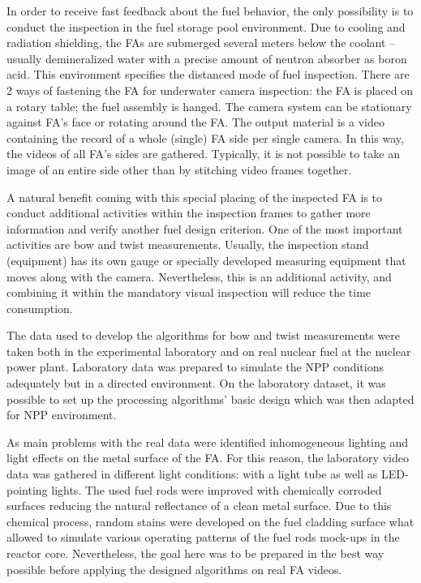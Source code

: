 \documentclass[preprint,12pt]{elsarticle}
\begin{document}
In order to receive fast feedback about the fuel behavior, the only possibility is to conduct the inspection in the fuel storage pool environment. Due to cooling and radiation  shielding, the \ac{FA}s are submerged several meters below the coolant – usually demineralized water with a precise amount of neutron absorber as boron acid. This environment specifies the distanced mode of fuel inspection. There are 2 ways of fastening the \ac{FA} for underwater camera inspection: the \ac{FA} is placed on a rotary table; the fuel assembly is hanged. The camera system can be stationary against \ac{FA}'s face or rotating around the \ac{FA}.  The output material is a video containing the record of a whole (single) \ac{FA} side per single camera. 
In this way, the videos of all \ac{FA}’s sides are gathered. Typically, it is not possible to take an image of an entire side other than by stitching video frames together.

A natural benefit coming with this special placing of the inspected \ac{FA} is to conduct additional activities within the inspection frames to gather more information and verify another fuel design criterion. One of the most important activities are bow and twist measurements. Usually, the inspection stand (equipment) has its own gauge or specially developed measuring equipment that moves along with the camera. Nevertheless, this is an additional activity, and combining it within the mandatory visual inspection will reduce the time consumption.

The data used to develop the algorithms for bow and twist measurements were taken both in the experimental laboratory and on real nuclear fuel at the nuclear power plant. Laboratory data was prepared to simulate the \ac{NPP} conditions adequately but in a directed environment. On the laboratory dataset, it was possible to set up the processing algorithms' basic design which was then adapted for \ac{NPP} environment. 

As main problems with the real data were identified inhomogeneous lighting and light effects on the metal surface of the \ac{FA}. For this reason, the laboratory video data was gathered in different light conditions: with a light tube as well as LED-pointing lights. The used fuel rods were improved with chemically corroded surfaces reducing the natural reflectance of a clean metal surface. Due to this chemical process, random stains were developed on the fuel cladding surface what allowed to simulate various operating patterns of the fuel rods mock-ups in the reactor core. Nevertheless, the goal here was to be prepared in the best way possible before applying the designed algorithms on real \ac{FA} videos. 
\end{document}
